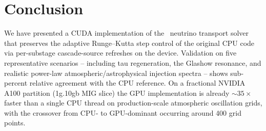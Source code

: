 \section{Conclusion}
\label{sec:conclusion}


We have presented a CUDA implementation of the \nusquids\ neutrino
transport solver that preserves the adaptive Runge--Kutta step
control of the original CPU code via per-substage cascade-source
refreshes on the device. Validation on five representative scenarios
-- including tau regeneration, the Glashow resonance, and realistic
power-law atmospheric/astrophysical injection spectra -- shows
sub-percent relative agreement with the CPU reference. On a fractional
NVIDIA A100 partition (1g.10gb MIG slice) the GPU implementation is
already $\sim 35\times$ faster than a single CPU thread on
production-scale atmospheric oscillation grids, with the crossover
from CPU- to GPU-dominant occurring around 400 grid points.

